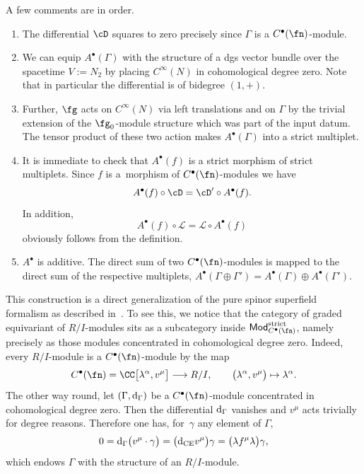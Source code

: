 \documentclass[10pt,a4paper]{amsart}
\numberwithin{equation}{section}
\def\cat#1{\ensuremath{\mathsf{#1}}}
\DeclareMathOperator{\Mod}{\cat{Mod}}
\def\d{{\rm d}}
\def\sL{\mathscr L}
\begin{document}
A few comments are in order.

\begin{enumerate}\itemsep=0pt
	\item The differential $\cD$ squares to zero precisely since $\Gamma$ is a $C^\bullet(\fn)$-module.
	\item We can equip $A^\bullet(\Gamma)$ with the structure of a dgs vector bundle over the spacetime $V := N_2$ by placing $C^\infty(N)$ in cohomological degree zero. Note that in particular the differential is of bidegree $(1,+)$.
	
	\item Further, $\fg$ acts on $C^\infty(N)$ via left translations and on $\Gamma$ by the trivial extension of the $\fg_0$-module structure which was part of the input datum. The tensor product of these two action makes $A^\bullet(\Gamma)$ into a strict multiplet.
	\item It is immediate to check that $A^\bullet(f)$ is a strict morphism of strict multiplets. Since $f$ is a~morphism of $C^\bullet(\fn)$-modules we have
	\begin{equation*}
	A^\bullet(f) \circ \cD = \cD' \circ A^\bullet(f) .
	\end{equation*}
	In addition,
	\begin{equation*}
	A^\bullet(f) \circ \sL = \sL \circ A^\bullet(f)
	\end{equation*}
	obviously follows from the definition.
	\item $A^\bullet$ is additive. The direct sum of two $C^\bullet(\fn)$-modules is mapped to the direct sum of the respective multiplets, $A^\bullet(\Gamma \oplus \Gamma') = A^\bullet(\Gamma) \oplus A^\bullet(\Gamma')$.
\end{enumerate}

This construction is a direct generalization of the pure spinor superfield formalism as described in~\cite{perspectives}. To see this, we notice that the category of graded equivariant of $R/I$-modules sits as a subcategory inside $\Mod_{C^\bullet(\fn)}^{\mathrm{strict}}$, namely precisely as those modules concentrated in cohomological degree zero. Indeed, every $R/I$-module is a $C^\bullet(\fn)$-module by the map
\begin{equation*}
C^\bullet(\fn) = \CC\big[\lambda^\alpha,v^\mu\big] \longrightarrow R/I, \qquad \big(\lambda^\alpha , v^\mu\big) \mapsto \lambda^\alpha .
\end{equation*}
The other way round, let $(\Gamma , \d_\Gamma)$ be a $C^\bullet(\fn)$-module concentrated in cohomological degree zero. Then the differential $\d_\Gamma$ vanishes and $v^\mu$ acts trivially for degree reasons. Therefore one has, for~$\gamma$ any element of $\Gamma$,
\begin{equation*}
0 = \d_\Gamma \big(v^\mu \cdot \gamma\big) = \big(\d_{\mathrm{CE}} v^\mu\big) \gamma = \big(\lambda f^\mu \lambda\big) \gamma ,
\end{equation*}
which endows $\Gamma$ with the structure of an $R/I$-module.
\end{document}
